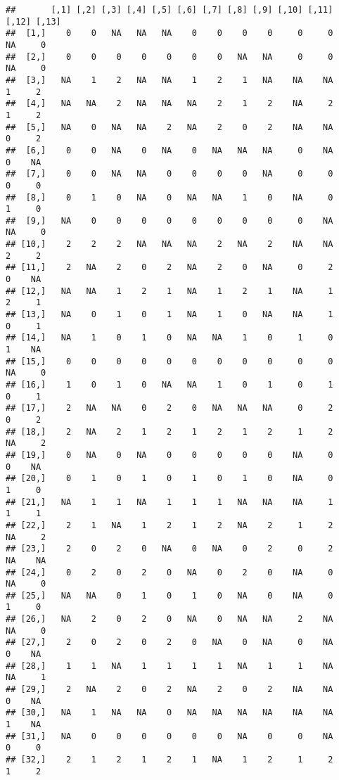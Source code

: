 \documentclass[
]{article}
\begin{document}
\begin{verbatim}
##       [,1] [,2] [,3] [,4] [,5] [,6] [,7] [,8] [,9] [,10] [,11] [,12] [,13]
##  [1,]    0    0   NA   NA   NA    0    0    0    0     0     0    NA     0
##  [2,]    0    0    0    0    0    0    0   NA   NA     0     0    NA     0
##  [3,]   NA    1    2   NA   NA    1    2    1   NA    NA    NA     1     2
##  [4,]   NA   NA    2   NA   NA   NA    2    1    2    NA     2     1     2
##  [5,]   NA    0   NA   NA    2   NA    2    0    2    NA    NA     0     2
##  [6,]    0    0   NA    0   NA    0   NA   NA   NA     0    NA     0    NA
##  [7,]    0    0   NA   NA    0    0    0    0   NA     0     0     0     0
##  [8,]    0    1    0   NA    0   NA   NA    1    0    NA     0     1     0
##  [9,]   NA    0    0    0    0    0    0    0    0     0    NA    NA     0
## [10,]    2    2    2   NA   NA   NA    2   NA    2    NA    NA     2     2
## [11,]    2   NA    2    0    2   NA    2    0   NA     0     2     0    NA
## [12,]   NA   NA    1    2    1   NA    1    2    1    NA     1     2     1
## [13,]   NA    0    1    0    1   NA    1    0   NA    NA     1     0     1
## [14,]   NA    1    0    1    0   NA   NA    1    0     1     0     1    NA
## [15,]    0    0    0    0    0    0    0    0    0     0     0    NA     0
## [16,]    1    0    1    0   NA   NA    1    0    1     0     1     0     1
## [17,]    2   NA   NA    0    2    0   NA   NA   NA     0     2     0     2
## [18,]    2   NA    2    1    2    1    2    1    2     1     2    NA     2
## [19,]    0   NA    0   NA    0    0    0    0    0    NA     0     0    NA
## [20,]    0    1    0    1    0    1    0    1    0    NA     0     1     0
## [21,]   NA    1    1   NA    1    1    1   NA   NA    NA     1     1     1
## [22,]    2    1   NA    1    2    1    2   NA    2     1     2    NA     2
## [23,]    2    0    2    0   NA    0   NA    0    2     0     2    NA    NA
## [24,]    0    2    0    2    0   NA    0    2    0    NA     0    NA     0
## [25,]   NA   NA    0    1    0    1    0   NA    0    NA     0     1     0
## [26,]   NA    2    0    2    0   NA    0   NA   NA     2    NA    NA     0
## [27,]    2    0    2    0    2    0   NA    0   NA     0    NA     0    NA
## [28,]    1    1   NA    1    1    1    1   NA    1     1    NA    NA     1
## [29,]    2   NA    2    0    2   NA    2    0    2    NA    NA     0    NA
## [30,]   NA    1   NA   NA    0   NA   NA   NA   NA    NA    NA     1    NA
## [31,]   NA    0    0    0    0    0    0   NA    0     0    NA     0     0
## [32,]    2    1    2    1    2    1   NA    1    2     1     2     1     2

\end{verbatim}
\end{document}
